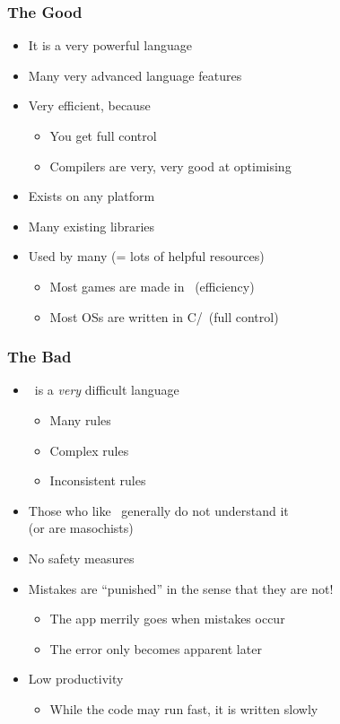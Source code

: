 \documentclass{../ucll-slides}
\begin{document}
\begin{frame}
  \frametitle{The Good}
  \begin{itemize}
    \item It is a very powerful language
    \item Many very advanced language features
    \item Very efficient, because
          \begin{itemize}
            \item You get full control
            \item Compilers are very, very good at optimising
          \end{itemize}
    \item Exists on any platform
    \item Many existing libraries
    \item Used by many (= lots of helpful resources)
          \begin{itemize}
            \item Most games are made in \cpp\ (efficiency)
            \item Most OSs are written in C/\cpp\ (full control)
          \end{itemize}
  \end{itemize}
\end{frame}

\begin{frame}
  \frametitle{The Bad}
  \begin{itemize}
    \item \cpp\ is a \emph{very} difficult language
          \begin{itemize}
            \item Many rules
            \item Complex rules
            \item Inconsistent rules
          \end{itemize}
    \item Those who like \cpp\ generally do not understand it \\
          (or are masochists)
    \item No safety measures
    \item Mistakes are ``punished'' in the sense that they are not!
          \begin{itemize}
            \item The app merrily goes when mistakes occur
            \item The error only becomes apparent later
          \end{itemize}
    \item Low productivity
          \begin{itemize}
            \item While the code may run fast, it is written slowly
          \end{itemize}
  \end{itemize}
\end{frame}
\end{document}

